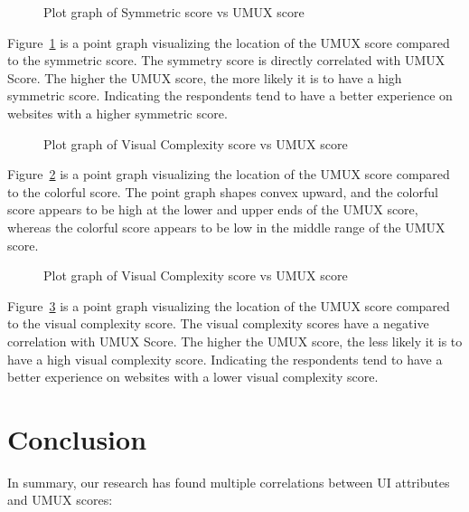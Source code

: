 \documentclass[conference]{IEEEtran}
\begin{document}
\begin{figure}[!ht]
    \centering
    \scalebox{0.57}{
        
    }
    \caption{Plot graph of Symmetric score vs UMUX score}
    \label{fig:symmetricumux}
\end{figure}

Figure~\ref{fig:symmetricumux} is a point graph visualizing the location of the UMUX score compared to the symmetric score. The symmetry score is directly correlated with UMUX Score. The higher the UMUX score, the more likely it is to have a high symmetric score. Indicating the respondents tend to have a better experience on websites with a higher symmetric score.

\begin{figure}[!ht]
    \centering
    \scalebox{0.57}{
        
    }
    \caption{Plot graph of Visual Complexity score vs UMUX score}
    \label{fig:colorfulumux}
\end{figure}

Figure~\ref{fig:colorfulumux} is a point graph visualizing the location of the UMUX score compared to the colorful score. The point graph shapes convex upward, and the colorful score appears to be high at the lower and upper ends of the UMUX score, whereas the colorful score appears to be low in the middle range of the UMUX score.

\begin{figure}[!ht]
    \centering
    \scalebox{0.57}{
        
    }
    \caption{Plot graph of Visual Complexity score vs UMUX score}
    \label{fig:viscomplexumux}
\end{figure}

Figure~\ref{fig:viscomplexumux} is a point graph visualizing the location of the UMUX score compared to the visual complexity score. The visual complexity scores have a negative correlation with UMUX Score. The higher the UMUX score, the less likely it is to have a high visual complexity score. Indicating the respondents tend to have a better experience on websites with a lower visual complexity score.

\section{Conclusion}

In summary, our research has found multiple correlations between UI attributes and UMUX scores:
\end{document}

